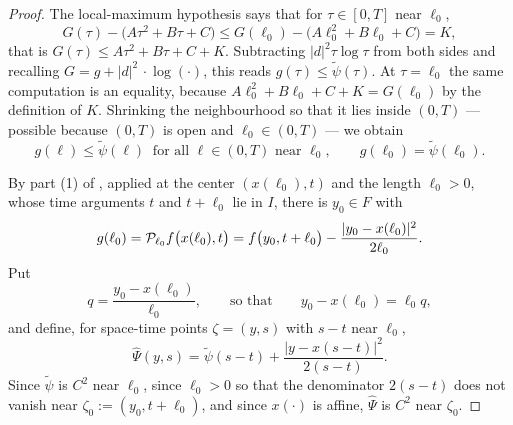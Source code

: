\begin{proof}
The local-maximum hypothesis says that for $\tau\in[0,T]$ near $\ell_0$,
\[
  G(\tau)-\bigl(A\tau^2+B\tau+C\bigr)\le G(\ell_0)-\bigl(A\ell_0^2+B\ell_0+C\bigr)=K,
\]
that is $G(\tau)\le A\tau^2+B\tau+C+K$. Subtracting $|d|^2\tau\log\tau$ from both
sides and recalling $G=g+|d|^2\,\cdot\log(\cdot)$, this reads
$g(\tau)\le\widetilde\psi(\tau)$. At $\tau=\ell_0$ the same computation is an
equality, because $A\ell_0^2+B\ell_0+C+K=G(\ell_0)$ by the definition of $K$.
Shrinking the neighbourhood so that it lies inside $(0,T)$ — possible because
$(0,T)$ is open and $\ell_0\in(0,T)$ — we obtain
\begin{equation}\label{eq:qpc-test}
  g(\ell)\le\widetilde\psi(\ell)\ \text{ for all $\ell\in(0,T)$ near }\ell_0,
  \qquad g(\ell_0)=\widetilde\psi(\ell_0).
\end{equation}

By part (1) of , applied at the center
$(x(\ell_0),t)$ and the length $\ell_0>0$, whose time arguments $t$ and
$t+\ell_0$ lie in $I$, there is $y_0\in F$ with
\begin{equation}\label{eq:qpc-opt}
  g(\ell_0)=\mathcal{P}_{\ell_0}f\bigl(x(\ell_0),t\bigr)
   =f\bigl(y_0,t+\ell_0\bigr)-\frac{|y_0-x(\ell_0)|^2}{2\ell_0}.
\end{equation}
Put
\[
  q=\frac{y_0-x(\ell_0)}{\ell_0},\qquad\text{so that}\qquad y_0-x(\ell_0)=\ell_0q,
\]
and define, for space-time points $\zeta=(y,s)$ with $s-t$ near $\ell_0$,
\[
  \widehat\Psi(y,s)=\widetilde\psi(s-t)+\frac{|y-x(s-t)|^2}{2(s-t)} .
\]
Since $\widetilde\psi$ is $C^2$ near $\ell_0$, since $\ell_0>0$ so that the
denominator $2(s-t)$ does not vanish near $\zeta_0:=(y_0,t+\ell_0)$, and since
$x(\cdot)$ is affine, $\widehat\Psi$ is $C^2$ near $\zeta_0$.


\end{proof}
